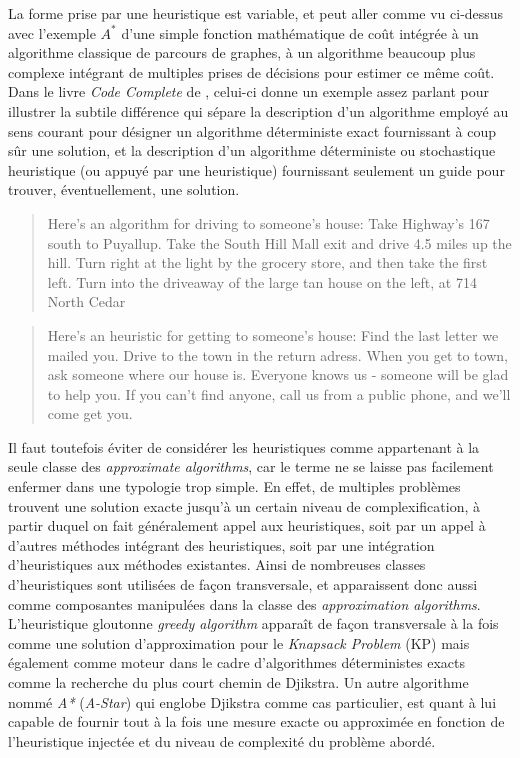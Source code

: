 La forme prise par une heuristique est variable, et peut aller comme vu ci-dessus avec l'exemple $A^*$ d'une simple fonction mathématique de coût intégrée à un algorithme classique de parcours de graphes, à un algorithme beaucoup plus complexe intégrant de multiples prises de décisions pour estimer ce même coût. Dans le livre \textit{Code Complete} de \textcite[12]{McConnell2004}, celui-ci donne un exemple assez parlant pour illustrer la subtile différence qui sépare la description d'un algorithme employé au sens courant pour désigner un algorithme déterministe exact fournissant à coup sûr une solution, et la description d'un algorithme déterministe ou stochastique heuristique (ou appuyé par une heuristique) fournissant seulement un guide pour trouver, éventuellement, une solution.

\foreignblockquote{english}{Here's an algorithm for driving to someone's house: Take Highway's 167 south to Puyallup. Take the South Hill Mall exit and drive 4.5 miles up the hill. Turn right at the light by the grocery store, and then take the first left. Turn into the driveaway of the large tan house on the left, at 714 North Cedar}

\foreignblockquote{english}{Here's an heuristic for getting to someone's house: Find the last letter we mailed you. Drive to the town in the return adress. When you get to town, ask someone where our house is. Everyone knows us - someone will be glad to help you. If you can't find anyone, call us from a public phone, and we'll come get you.}

Il faut toutefois éviter de considérer les heuristiques comme appartenant à la seule classe des \textit{approximate algorithms}, car le terme ne se laisse pas facilement enfermer dans une typologie trop simple. En effet, de multiples problèmes trouvent une solution exacte jusqu'à un certain niveau de complexification, à partir duquel on fait généralement appel aux heuristiques, soit par un appel à d'autres méthodes intégrant des heuristiques, soit par une intégration d'heuristiques aux méthodes existantes. Ainsi de nombreuses classes d'heuristiques sont utilisées de façon transversale, et apparaissent donc aussi comme composantes manipulées dans la classe des \textit{approximation algorithms}. L'heuristique gloutonne \textit{greedy algorithm}  apparaît de façon transversale à la fois comme une solution d'approximation pour le \textit{Knapsack Problem} (KP) mais également comme moteur dans le cadre d'algorithmes déterministes exacts comme la recherche du plus court chemin de Djikstra. Un autre algorithme nommé \textit{A*} (\textit{A-Star}) qui englobe Djikstra comme cas particulier, est quant à lui capable de fournir tout à la fois une mesure exacte ou approximée en fonction de l'heuristique injectée et du niveau de complexité du problème abordé.

